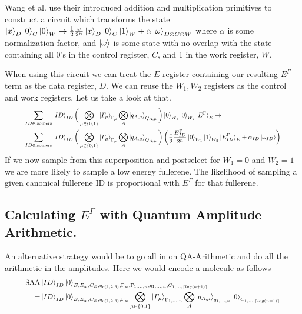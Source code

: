 \vspace{\baselineskip}
Wang et al. use their introduced addition and multiplication primitives to construct a circuit which transforms the state $\ket{x}_D\ket{0}_C\ket{0}_W \to \frac{1}{2}\frac{x}{2^n}\ket{x}_D\ket{0}_C\ket{1}_W+\alpha\ket{\omega}_{D \otimes C\otimes W}$ where $\alpha$ is some normalization factor, and $\ket{\omega}$ is some state with no overlap with the state containing all 0's in the control register, $C$, and 1 in the work register, $W$.


\vspace{\baselineskip}
When using this circuit we can treat the $E$ register containing our resulting $E^\Gamma$ term as the data register, $D$. We can reuse the $W_1,W_2$ registers as the control and work registers. Let us take a look at that.
\begin{equation}
   \resizebox{.9\hsize}{!}{$\begin{split}
       \sum_{ID\in \text{isomers}}&\ket{ID}_{ID}\bigg(\bigotimes_{\mu\in \{0,1\}}\ket{\varGamma_\mu}_{\Gamma_\mu}\bigotimes_{A}\ket{q_{A,\mu}}_{Q_{A,\mu}}\bigg)\ket{0}_{W_1}\ket{0}_{W_2}\ket{E^\Gamma}_E \to\\ 
       \sum_{ID\in \text{isomers}}&\ket{ID}_{ID}\bigg(\bigotimes_{\mu\in \{0,1\}}\ket{\varGamma_\mu}_{\Gamma_\mu}\bigotimes_{A}\ket{q_{A,\mu}}_{Q_{A,\mu}}\bigg)\left(\frac{1}{2}\frac{E^\Gamma_{ID}}{2^n}\ket{0}_{W_1}\ket{1}_{W_2}\ket{E^\Gamma_{ID}}_E+\alpha_{ID}\ket{\omega_{ID}}\right) \\ 
   \end{split}$}
\end{equation}
If we now sample from this superposition and postselect for $W_1 = 0$ and $W_2 = 1$ we are more likely to sample a low energy fullerene. The likelihood of sampling a given canonical fullerene ID is proportional with $E^\Gamma$ for that fullerene.



\subsection{Calculating $E^\Gamma$ with Quantum Amplitude Arithmetic.}
An alternative strategy would be to go all in on QA-Arithmetic and do all the arithmetic in the amplitudes. 
Here we would encode a molecule as follows
\begin{equation}
   \resizebox{.9\hsize}{!}{$\begin{split}
       \text{SAA}&\ket{ID}_{ID}\ket{0}_{E,E_w,C_E,q_{o(1,2,3)},\Gamma_w,\Gamma_{1,\dots,n},q_{1,\dots,n},C_{1,\dots,\lceil log(n+1) \rceil}}\\
       =&\ket{ID}_{ID}\ket{0}_{E,E_w,C_E,q_{o(1,2,3)},\Gamma_w}\bigotimes_{\mu\in\{0,1\}}\ket{\varGamma_\mu}_{\Gamma_{1,\dots,n}}\bigotimes_{A}\ket{q_{A,\mu}}_{q_{1,\dots,n}}\ket{0}_{C_{1,\dots,\lceil log(n+1) \rceil}}
   \end{split}$}
\end{equation}

